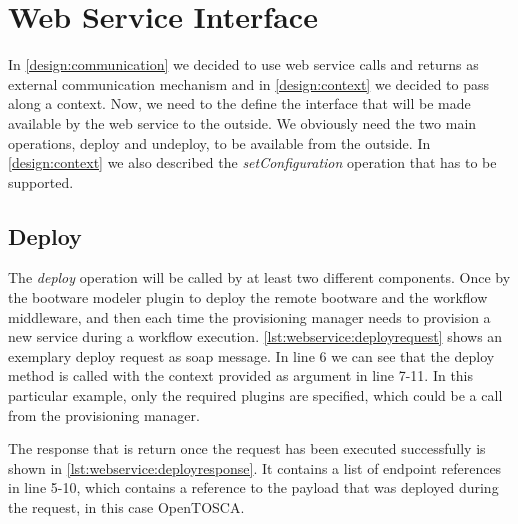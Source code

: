 \section{Web Service Interface}
\label{implementation:webservice}

In \autoref{design:communication} we decided to use web service calls and returns as external communication mechanism and in \autoref{design:context} we decided to pass along a context.
Now, we need to the define the interface that will be made available by the web service to the outside.
We obviously need the two main operations, deploy and undeploy, to be available from the outside.
In \autoref{design:context} we also described the \textit{setConfiguration} operation that has to be supported.

\subsection{Deploy}

The \textit{deploy} operation will be called by at least two different components.
Once by the bootware modeler plugin to deploy the remote bootware and the workflow middleware, and then each time the provisioning manager needs to provision a new service during a workflow execution.
\autoref{lst:webservice:deployrequest} shows an exemplary deploy request as soap message.
In line 6 we can see that the deploy method is called with the context provided as argument in line 7-11.
In this particular example, only the required plugins are specified, which could be a call from the provisioning manager.

\vspace*{\baselineskip}

The response that is return once the request has been executed successfully is shown in \autoref{lst:webservice:deployresponse}.
It contains a list of endpoint references in line 5-10, which contains a reference to the payload that was deployed during the request, in this case OpenTOSCA.

\vspace*{\baselineskip}

